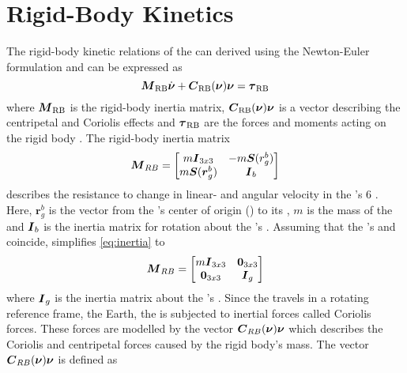 \section{Rigid-Body Kinetics} 
The rigid-body kinetic relations of the \abbrROV can derived using the Newton-Euler formulation and can be expressed as
\begin{equation}\label{eq:rb}
\boldsymbol{M}_{\text{RB}}\dot{\boldsymbol{\nu}} + \boldsymbol{C}_{\text{RB}}(\boldsymbol{\nu})\boldsymbol{\nu} = \boldsymbol{\tau}_{\text{RB}}
\end{equation} where $\boldsymbol{M}_{\text{RB}}$ is the rigid-body inertia matrix, $\boldsymbol{C}_{\text{RB}}(\boldsymbol{\nu})\boldsymbol{\nu}$ is a vector describing the centripetal and Coriolis effects and $\boldsymbol{\tau}_{\text{RB}}$ are the forces and moments acting on the rigid body \citep[p. 45]{fossen2011}.
The rigid-body inertia matrix 
\begin{equation}
\label{eq:inertia}
    \boldsymbol{M}_{RB} = 
    \begin{bmatrix}
    m\boldsymbol{I}_{3x3}       & -m\boldsymbol{S}(r^b_g) \\
    m\boldsymbol{S}(\boldsymbol{r}^b_g) & \boldsymbol{I}_{b}
    \end{bmatrix}
\end{equation}
describes the resistance to change in linear- and angular velocity in the \abbrROV's 6 \abbrDOF. Here, $\boldsymbol{r}^b_g$ is the vector from the \abbrROV's center of origin (\abbrCO) to its \abbrCG, $m$ is the mass of the \abbrROV and $\boldsymbol{I}_{b}$ is the inertia matrix for rotation about the \abbrROV's \abbrCO \citep[p. 50]{fossen2011}.
Assuming that the \abbrROV's \abbrCO and \abbrCG coincide, simplifies \eqref{eq:inertia} to
\begin{equation}
   \boldsymbol{M}_{RB} = 
    \begin{bmatrix}
        m\boldsymbol{I}_{3x3} & \boldsymbol{0}_{3x3} \\
        \boldsymbol{0}_{3x3} & \boldsymbol{I}_{g}
    \end{bmatrix}
\end{equation}
where $\boldsymbol{I}_{g}$ is the inertia matrix about the \abbrROV's \abbrCG.
Since the \abbrROV travels in a rotating reference frame, the Earth, the \abbrROV is subjected to inertial forces called Coriolis forces. These forces are modelled by the vector $\boldsymbol{C}_{RB}(\boldsymbol{\nu})\boldsymbol{\nu}$ which describes the Coriolis and centripetal forces caused by the rigid body's mass. The vector $\boldsymbol{C}_{RB}(\boldsymbol{\nu})\boldsymbol{\nu}$ is defined as

